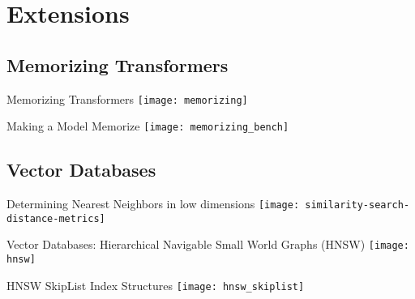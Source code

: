 \section{Extensions}

\subsection{Memorizing Transformers}

\begin{frame}[c]{Memorizing Transformers}
    \texttt{[image: memorizing]} \\
\end{frame}


\begin{frame}[c]{Making a Model Memorize}
    \texttt{[image: memorizing\_bench]} \\
\end{frame}


\subsection{Vector Databases}

\begin{frame}[c]{Determining Nearest Neighbors in low dimensions}
    \texttt{[image: similarity-search-distance-metrics]} \\
\end{frame}

\begin{frame}[c]{Vector Databases: Hierarchical Navigable Small World Graphs (HNSW)}
    \texttt{[image: hnsw]} \\

\end{frame}


\begin{frame}[c]{HNSW SkipList Index Structures}
    \texttt{[image: hnsw\_skiplist]} \\
\end{frame}

